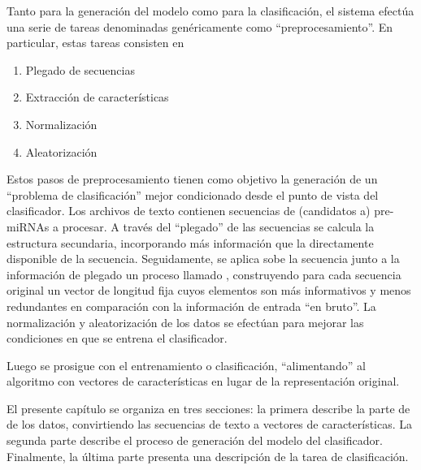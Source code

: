 Tanto para la generación del modelo como para la clasificación, el
sistema efectúa una serie de tareas denominadas genéricamente como
``preprocesamiento''. En particular, estas tareas consisten en
%
\begin{enumerate}
\item Plegado de secuencias
\item Extracción de características
\item Normalización
\item Aleatorización
\end{enumerate}
%
Estos pasos de preprocesamiento tienen como objetivo la generación de
un ``problema de clasificación'' mejor condicionado desde el punto de
vista del clasificador.  Los archivos de texto contienen secuencias de
(candidatos a) pre-miRNAs a procesar. A través del ``plegado'' de las
secuencias se calcula la estructura secundaria, incorporando más
información que la directamente disponible de la secuencia.
Seguidamente, se aplica sobe la secuencia junto a la información de
plegado un proceso llamado ,
construyendo para cada secuencia original un vector de longitud fija
cuyos elementos son más informativos y menos redundantes en
comparación con la información de entrada ``en bruto''.  La
normalización y aleatorización de los datos se efectúan para mejorar
las condiciones en que se entrena el clasificador.

Luego se prosigue con el entrenamiento o clasificación,
``alimentando'' al algoritmo con vectores de características en lugar
de la representación original.

El presente capítulo se organiza en tres secciones: la primera
describe la parte de  de los datos, convirtiendo
las secuencias de texto a vectores de características. La segunda
parte describe el proceso de generación del modelo del
clasificador. Finalmente, la última parte presenta una descripción de
la tarea de clasificación.
